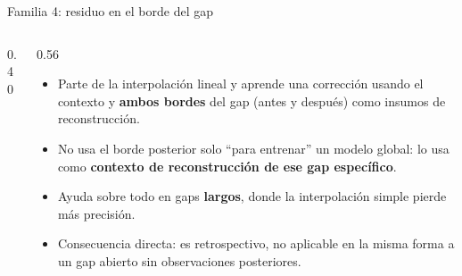 \documentclass[aspectratio=169,11pt]{beamer}
\begin{document}
\begin{frame}[t]{Familia 4: residuo en el borde del gap}
  \vskip4pt
  \begin{columns}[T]
    \begin{column}{0.40\textwidth}
      \centering
    \end{column}
    \begin{column}{0.56\textwidth}
      \vskip0.3cm
      {\footnotesize
      \begin{itemize}\setlength\itemsep{0.18cm}
        \item Parte de la interpolación lineal y aprende una corrección usando el
          contexto y \textbf{ambos bordes} del gap (antes y después) como insumos de
          reconstrucción.
        \item No usa el borde posterior solo ``para entrenar'' un modelo global: lo usa
          como \textbf{contexto de reconstrucción de ese gap específico}.
        \item Ayuda sobre todo en gaps \textbf{largos}, donde la interpolación simple
          pierde más precisión.
        \item Consecuencia directa: es retrospectivo, no aplicable en la misma forma a un
          gap abierto sin observaciones posteriores.
      \end{itemize}}
    \end{column}
  \end{columns}
\end{frame}
\end{document}

